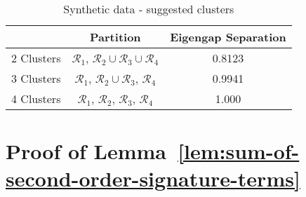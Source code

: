 \documentclass{amsart}[11pt]
\numberwithin{equation}{section}
\theoremstyle{definition}
\begin{document}
\begin{table}[ht]
\begin{tabular}{ccc}
\hline
           & Partition                                                              & Eigengap Separation \\ \hline
2 Clusters & $\mathcal{R}_1$, $\mathcal{R}_2 \cup \mathcal{R}_3 \cup \mathcal{R}_4$ & 0.8123                  \\
3 Clusters & $\mathcal{R}_1$, $\mathcal{R}_2 \cup \mathcal{R}_3$, $\mathcal{R}_4$   & 0.9941                  \\
4 Clusters & $\mathcal{R}_1$, $\mathcal{R}_2$, $\mathcal{R}_3$, $\mathcal{R}_4$     & 1.000                   \\ \hline
\end{tabular}
\vspace{0.1cm}
\caption{Synthetic data - suggested clusters}
\label{tab:synthetic-data-cluster-partitions}
\end{table}


\appendix
\section{Proof of Lemma~\ref{lem:sum-of-second-order-signature-terms}}\label{app:Proof}
\end{document}
